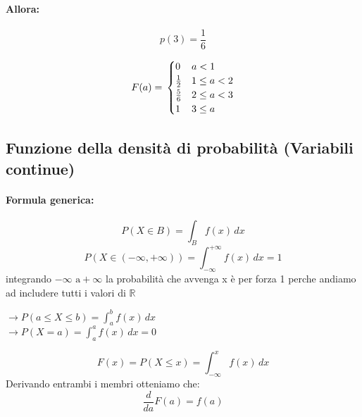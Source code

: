 \documentclass[]{article}
\newcommand{\formula}{\paragraph{Formula generica:}}
\begin{document}
    \paragraph{Allora:}
    \[ p(3) = \frac{1}{6}\]

    \begin{equation*}
        F(a) = \\
        \begin{cases}
            0 & a < 1 \\
            \frac{1}{2} & 1 \leq a < 2 \\
            \frac{5}{6} & 2 \leq a < 3 \\
            1 & 3 \leq a
        \end{cases}
    \end{equation*}

    \subsection{Funzione della densità di probabilità (Variabili continue)}
    \formula
    \[ P(X \in B) = \int_{B}^{} f(x) \,dx \]
    \[ P(X \in (-\infty, +\infty)) = \int_{-\infty}^{+\infty} f(x) \,dx=1 \]
    integrando $-\infty \text{ a} +\infty$ la probabilità che avvenga x è per forza 1 perche andiamo ad includere tutti i valori di $\mathbb{R}$

    \begin{center}
         $\longrightarrow P(a \leq X \leq b) = \int_{a}^{b} f(x) \, dx $
        \\
         $\longrightarrow P(X = a) = \int_{a}^{a} f(x) \, dx = 0 $
    \end{center}
   

    \[ F(x) = P(X \leq x) = \int_{-\infty}^{x} f(x )\, dx \]
    Derivando entrambi i membri otteniamo che:
    \[ \frac{d}{da} F(a) = f(a)  \]
\end{document}
